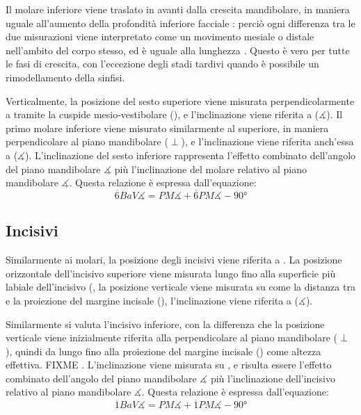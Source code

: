 Il molare inferiore viene traslato in avanti dalla crescita mandibolare, in maniera uguale all'aumento della profondità inferiore facciale : perciò ogni differenza tra le due misurazioni viene interpretato come un movimento mesiale o distale nell'ambito del corpo stesso, ed è uguale alla lunghezza . Questo è vero per tutte le fasi di crescita, con l'eccezione degli stadi tardivi quando è possibile un rimodellamento della sinfisi.

Verticalmente, la posizione del sesto superiore viene misurata perpendicolarmente a  tramite la cuspide mesio-vestibolare (), e l'inclinazione viene riferita a  ($\measuredangle$). Il primo molare inferiore viene misurato similarmente al superiore, in maniera perpendicolare al piano mandibolare ($\perp$), e l'inclinazione viene riferita anch'essa a  ($\measuredangle$). L'inclinazione del sesto inferiore rappresenta l'effetto combinato dell'angolo del piano mandibolare $\measuredangle$ più l'inclinazione del molare relativo al piano mandibolare $\measuredangle$. Questa relazione è espressa dall'equazione:
\begin{equation}
\overline{6}BaV\measuredangle = PM\measuredangle + \overline{6}PM\measuredangle - 90°
\end{equation}

\subsection*{Incisivi}
Similarmente ai molari, la posizione degli incisivi viene riferita a . La posizione orizzontale dell'incisivo superiore viene misurata lungo  fino alla superficie più labiale dell'incisivo (, la posizione verticale viene misurata su  come la distanza tra  e la proiezione del margine incisale (), l'inclinazione viene riferita a  ($\measuredangle$).

Similarmente si valuta l'incisivo inferiore, con la differenza che la posizione verticale viene inizialmente riferita alla perpendicolare al piano mandibolare ($\perp$), quindi da  lungo  fino alla proiezione del margine incisale () come altezza effettiva. { \huge FIXME }. L'inclinazione viene misurata su , e risulta essere l'effetto combinato dell'angolo del piano mandibolare $\measuredangle$ più l'inclinazione dell'incisivo relativo al piano mandibolare $\measuredangle$. Questa relazione è espressa dall'equazione:
\begin{equation}
\overline{1}BaV\measuredangle = PM\measuredangle + \overline{1}PM\measuredangle - 90°
\end{equation}

